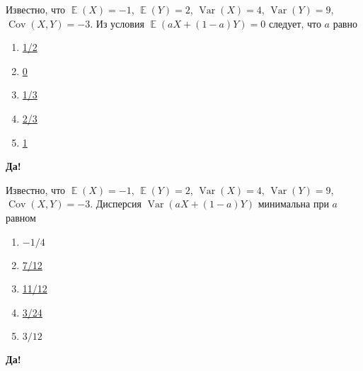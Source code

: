 \documentclass[t]{beamer}
\DeclareMathOperator{\Var}{Var}
\DeclareMathOperator{\Cov}{Cov}
\DeclareMathOperator{\E}{\mathbb{E}}
\begin{document}
 \begin{frame} \label{22-Yes} 
\begin{block}{22} 

Известно, что $\E(X)=-1$, $\E(Y)=2$, $\Var(X)=4$, $\Var(Y)=9$, $\Cov(X,Y)=-3$. Из условия  $\E(aX+(1-a)Y)=0$ следует, что $a$ равно


 \end{block} 
\begin{enumerate} 
\item[] \hyperlink{22-No}{\beamergotobutton{}  1/2 }
\item[] \hyperlink{22-No}{\beamergotobutton{}  0 }
\item[] \hyperlink{22-No}{\beamergotobutton{}  1/3 }
\item[] \hyperlink{22-Yes}{\beamergotobutton{}  2/3 }
\item[] \hyperlink{22-No}{\beamergotobutton{}  1 }
\end{enumerate} 

 \textbf{Да!} 
 \hyperlink{23}{}\end{frame} 


 \begin{frame} \label{23-Yes} 
\begin{block}{23} 

Известно, что $\E(X)=-1$, $\E(Y)=2$, $\Var(X)=4$, $\Var(Y)=9$, $\Cov(X,Y)=-3$. Дисперсия $\Var(aX+(1-a)Y)$ минимальна при $a$ равном


 \end{block} 
\begin{enumerate} 
\item[] \hyperlink{23-No}{\beamergotobutton{}  $-1/4$ }
\item[] \hyperlink{23-No}{\beamergotobutton{}  7/12 }
\item[] \hyperlink{23-Yes}{\beamergotobutton{}  11/12 }
\item[] \hyperlink{23-No}{\beamergotobutton{}  3/24 }
\item[] \hyperlink{23-No}{\beamergotobutton{}  $3/12$ }
\end{enumerate} 

 \textbf{Да!} 
 \hyperlink{24}{}\end{frame} 
\end{document}
